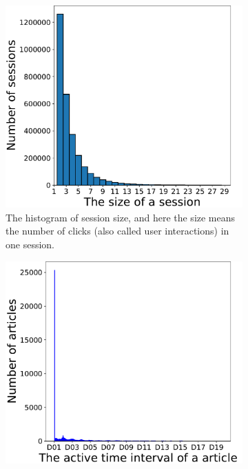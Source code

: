 \begin{figure}[htp]
    \begin{subfigure}[t]{0.3\textwidth}
        \includegraphics[width=\textwidth]{fig/data_distribution_a.pdf}
        \caption{The histogram of session size, and here the size means the number of clicks (also called user interactions) in one session.}
    \end{subfigure}
    \quad
    \begin{subfigure}[t]{0.3\textwidth}
        \includegraphics[width=\textwidth]{fig/data_distribution_b.pdf}

\end{subfigure}
\end{figure}
